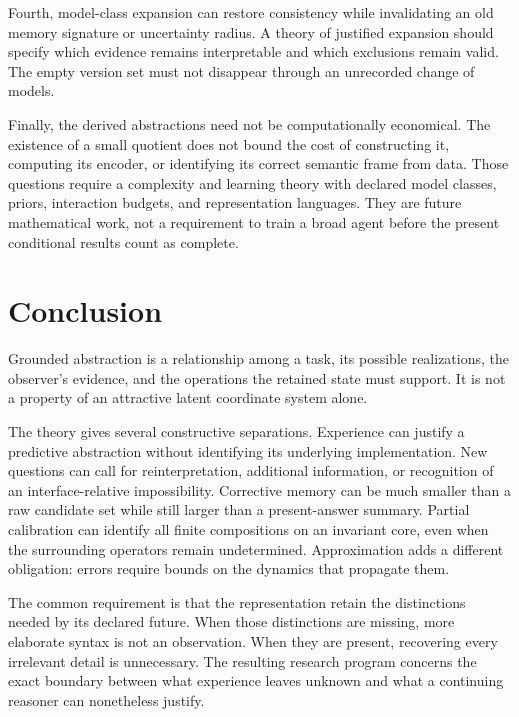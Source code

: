 \documentclass[11pt,letterpaper]{article}
\theoremstyle{plain}
\theoremstyle{definition}
\begin{document}
Fourth, model-class expansion can restore consistency while invalidating an old memory signature or uncertainty radius. A theory of justified expansion should specify which evidence remains interpretable and which exclusions remain valid. The empty version set must not disappear through an unrecorded change of models.

Finally, the derived abstractions need not be computationally economical. The existence of a small quotient does not bound the cost of constructing it, computing its encoder, or identifying its correct semantic frame from data. Those questions require a complexity and learning theory with declared model classes, priors, interaction budgets, and representation languages. They are future mathematical work, not a requirement to train a broad agent before the present conditional results count as complete.

\section{Conclusion}\label{sec:conclusion}
Grounded abstraction is a relationship among a task, its possible realizations, the observer's evidence, and the operations the retained state must support. It is not a property of an attractive latent coordinate system alone.

The theory gives several constructive separations. Experience can justify a predictive abstraction without identifying its underlying implementation. New questions can call for reinterpretation, additional information, or recognition of an interface-relative impossibility. Corrective memory can be much smaller than a raw candidate set while still larger than a present-answer summary. Partial calibration can identify all finite compositions on an invariant core, even when the surrounding operators remain undetermined. Approximation adds a different obligation: errors require bounds on the dynamics that propagate them.

The common requirement is that the representation retain the distinctions needed by its declared future. When those distinctions are missing, more elaborate syntax is not an observation. When they are present, recovering every irrelevant detail is unnecessary. The resulting research program concerns the exact boundary between what experience leaves unknown and what a continuing reasoner can nonetheless justify.

\FloatBarrier\clearpage\appendix
\end{document}
